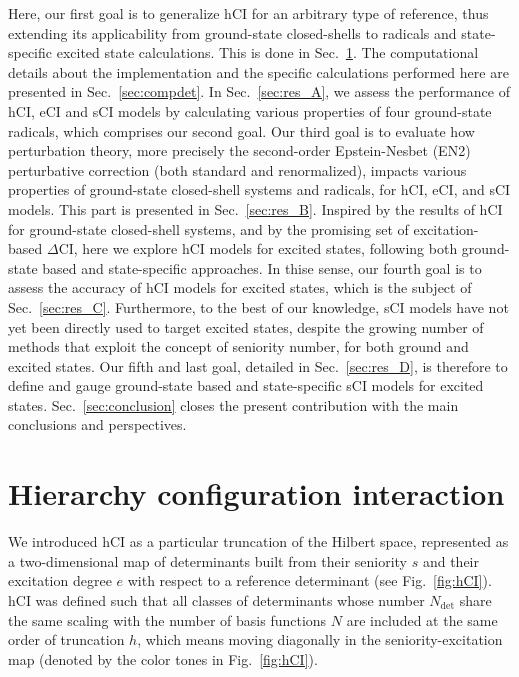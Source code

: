\documentclass[aip,jcp,reprint,noshowkeys,superscriptaddress]{revtex4-1}
\newcommand{\Ndet}{N_\text{det}}
\begin{document}
Here, our first goal is to generalize hCI for an arbitrary type of reference, thus extending its applicability from ground-state closed-shells \cite{Kossoski_2022}
to radicals and state-specific excited state calculations.
This is done in Sec.~\ref{sec:hCI}.
The computational details about the implementation and the specific calculations performed here are presented in Sec.~\ref{sec:compdet}.
In Sec.~\ref{sec:res_A}, we assess the performance of hCI, eCI and sCI models by calculating various properties of four ground-state radicals, which comprises our second goal.
Our third goal is to evaluate how perturbation theory, more precisely the second-order Epstein-Nesbet (EN2) perturbative correction (both standard and renormalized), \cite{Garniron_2019}
impacts various properties of ground-state closed-shell systems and radicals, for hCI, eCI, and sCI models.
This part is presented in Sec.~\ref{sec:res_B}.
Inspired by the results of hCI for ground-state closed-shell systems, \cite{Kossoski_2022} 
and by the promising set of excitation-based $\Delta$CI, \cite{Kossoski_2023} here we explore hCI models for excited states, following both ground-state based and state-specific approaches.
In thise sense, our fourth goal is to assess the accuracy of hCI models for excited states, which is the subject of Sec.~\ref{sec:res_C}.
Furthermore, to the best of our knowledge, sCI models have not yet been directly used to target excited states,
despite the growing number of methods that exploit the concept of seniority number,
for both ground
\cite{Limacher_2013,Limacher_2014,Tecmer_2014,Boguslawski_2014a,Boguslawski_2015,Boguslawski_2014b,Boguslawski_2014c,Johnson_2020,Henderson_2014,Stein_2014,Henderson_2015,Chen_2015,Bytautas_2018,Marie_2021,Boguslawski_2021,Tecmer_2022,Mamache_2023} 
and excited states.
\cite{Boguslawski_2016b,Boguslawski_2016c,Boguslawski_2019,Nowak_2019,Kossoski_2021,Marie_2021,Tecmer_2022,Rishi_2023,Nowak_2023} 
Our fifth and last goal, detailed in Sec.~\ref{sec:res_D}, is therefore to define and gauge ground-state based and state-specific sCI models for excited states.
Sec.~\ref{sec:conclusion} closes the present contribution with the main conclusions and perspectives.


\section{Hierarchy configuration interaction}
\label{sec:hCI}

We introduced hCI \cite{Kossoski_2022} as a particular truncation of the Hilbert space,
represented as a two-dimensional map of determinants built from their seniority $s$ and their excitation degree $e$ with respect to a reference determinant (see Fig.~\ref{fig:hCI}).
hCI was defined such that all classes of determinants whose number $\Ndet$ share the same scaling with the number of basis functions $N$ are included at the same order of truncation $h$,
which means moving diagonally in the seniority-excitation map (denoted by the color tones in Fig.~\ref{fig:hCI}).
\end{document}
